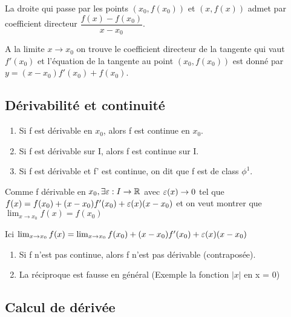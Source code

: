 \documentclass[a4paper, 12pt]{article}
\begin{document}
\begin{definition}
    La droite qui passe par les points $(x_0, f(x_0))$ et $(x, f(x))$ admet par coefficient directeur $\dfrac{f(x) - f(x_0)}{x - x_0}$.

    A la limite $x \rightarrow x_0$ on trouve le coefficient directeur de la tangente qui vaut $f'(x_0)$ et l'équation de la tangente au point
    $(x_0, f(x_0))$ est donné par $y = (x - x_0)f'(x_0) + f(x_0)$.
\end{definition}

\subsection{Dérivabilité et continuité}

\begin{proposition}
    \begin{enumerate}
        \item Si f est dérivable en $x_0$, alors f est continue en $x_0$.
        \item Si f est dérivable sur I, alors f est continue sur I.
        \item Si f est dérivable et f' est continue, on dit que f est de class $\phi^1$. %
    \end{enumerate}
\end{proposition}

\begin{demonstration}
    Comme f dérivable en $x_0, \exists \varepsilon: I \rightarrow \mathbb{R}$ avec $\varepsilon(x) \to 0$ %
    tel que $f(x) = f(x_0) + (x - x_0)f'(x_0) + \varepsilon(x)(x-x_0)$
    et on veut montrer que $\lim_{x \to x_0}f(x) = f(x_0)$

    Ici $\lim_{x \to x_0}f(x) = \lim_{x \to x_0}f(x_0)+(x - x_0)f'(x_0) + \varepsilon(x)(x - x_0)$
\end{demonstration}

\begin{remark}
    \begin{enumerate}
        \item Si f n'est pas continue, alors f n'est pas dérivable (contraposée).
        \item La réciproque est fausse en général (Exemple la fonction $|x|$ en x = 0)
    \end{enumerate}
\end{remark}

\subsection{Calcul de dérivée}
\end{document}
